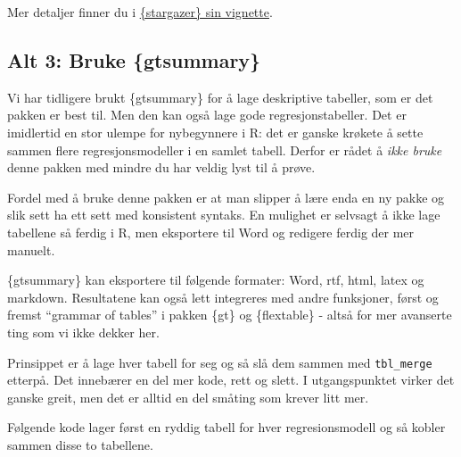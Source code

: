 \documentclass[
  norsk,
  letterpaper,
  DIV=11,
  numbers=noendperiod]{scrreprt}
\theoremstyle{definition}
\theoremstyle{remark}
\begin{document}
Mer detaljer finner du i
\href{https://cran.r-project.org/web/packages/stargazer/vignettes/stargazer.pdf}{\{stargazer\}
sin vignette}.

\subsection{Alt 3: Bruke \{gtsummary\}}\label{alt-3-bruke-gtsummary}

Vi har tidligere brukt \{gtsummary\} for å lage deskriptive tabeller,
som er det pakken er best til. Men den kan også lage gode
regresjonstabeller. Det er imidlertid en stor ulempe for nybegynnere i
R: det er ganske krøkete å sette sammen flere regresjonsmodeller i en
samlet tabell. Derfor er rådet å \emph{ikke bruke} denne pakken med
mindre du har veldig lyst til å prøve.

Fordel med å bruke denne pakken er at man slipper å lære enda en ny
pakke og slik sett ha ett sett med konsistent syntaks. En mulighet er
selvsagt å ikke lage tabellene så ferdig i R, men eksportere til Word og
redigere ferdig der mer manuelt.

\{gtsummary\} kan eksportere til følgende formater: Word, rtf, html,
latex og markdown. Resultatene kan også lett integreres med andre
funksjoner, først og fremst ``grammar of tables'' i pakken \{gt\} og
\{flextable\} - altså for mer avanserte ting som vi ikke dekker her.

Prinsippet er å lage hver tabell for seg og så slå dem sammen med
\texttt{tbl\_merge} etterpå. Det innebærer en del mer kode, rett og
slett. I utgangspunktet virker det ganske greit, men det er alltid en
del småting som krever litt mer.

Følgende kode lager først en ryddig tabell for hver regresionsmodell og
så kobler sammen disse to tabellene.
\end{document}
